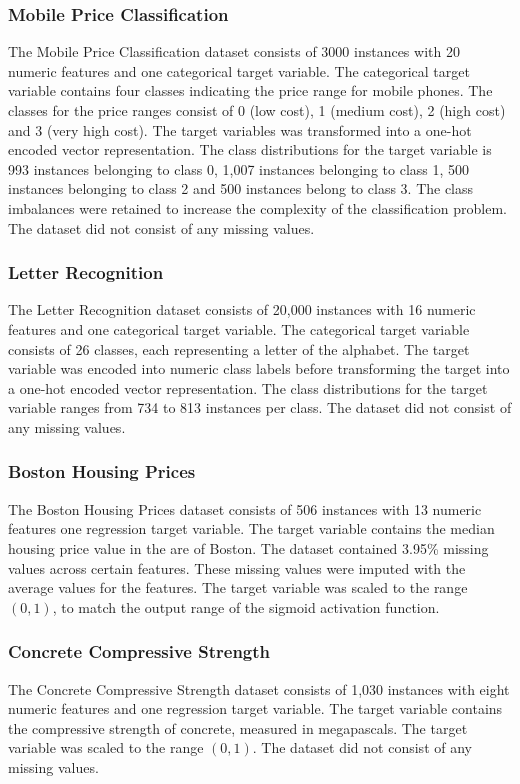 \documentclass[conference]{IEEEtran}
\begin{document}
	\subsubsection{Mobile Price Classification}
	The Mobile Price Classification dataset consists of 3000 instances with 20 numeric features and one categorical target variable. The categorical target variable
	contains four classes indicating the price range for mobile phones. The classes for the price ranges consist of 0 (low cost), 1 (medium cost), 2 (high cost) and 3 (very high cost). The target variables was transformed into a one-hot encoded vector representation. The class distributions for the target variable is 993 instances belonging to class 0, 1,007 instances belonging to class 1, 500 instances belonging to class 2 and 500 instances belong to class 3. The class imbalances were retained to increase the complexity of the classification problem. The dataset did not consist of any missing values.
	
	\subsubsection{Letter Recognition}
	The Letter Recognition dataset consists of 20,000 instances with 16 numeric features and one categorical target variable. The categorical target variable consists of 26 classes, each representing a letter of the alphabet. The target variable was encoded into numeric class labels before transforming the target into a one-hot encoded vector representation. The class distributions for the target variable ranges from 734 to 813 instances per class. The dataset did not consist of any missing values.
	
	\subsubsection{Boston Housing Prices}
	The Boston Housing Prices dataset consists of 506 instances with 13 numeric features one regression target variable. The target variable contains the median housing price value in the are of Boston. The dataset contained 3.95\% missing values across certain features. These missing values were imputed with the average values for the features. The target variable was scaled to the range $(0, 1)$, to match the output range of the sigmoid activation function.
	
	\subsubsection{Concrete Compressive Strength}
	The Concrete Compressive Strength dataset consists of 1,030 instances with eight numeric features and one regression target variable. The target variable contains the compressive strength of concrete, measured in megapascals. The target variable was scaled to the range $(0, 1)$. The dataset did not consist of any missing values.
	
\end{document}
